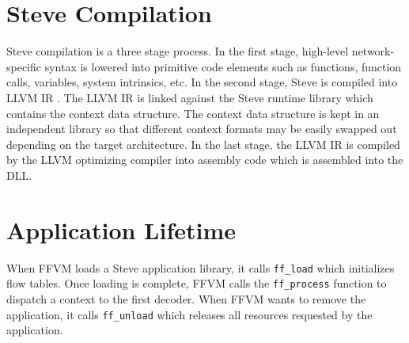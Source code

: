\section{Steve Compilation} \label{compile}

Steve compilation is a three stage process.
In the first stage, high-level network-specific syntax is lowered into primitive code elements such as functions, function calls, variables, system intrinsics, etc.
In the second stage, Steve is compiled into LLVM IR \cite{llvm_webpage}. The LLVM IR is linked against the Steve runtime library which contains the context data structure. The context data structure is kept in an independent library so that different context formats may be easily swapped out depending on the target architecture.
In the last stage, the LLVM IR is compiled by the LLVM optimizing compiler into assembly code which is assembled into the DLL.

\section{Application Lifetime} \label{lifetime}

When FFVM loads a Steve application library, it calls \texttt{ff\_load} which initializes flow tables. Once loading is complete, FFVM calls the \texttt{ff\_process} function to dispatch a context to the first decoder. When FFVM wants to remove the application, it calls \texttt{ff\_unload} which releases all resources requested by the application.